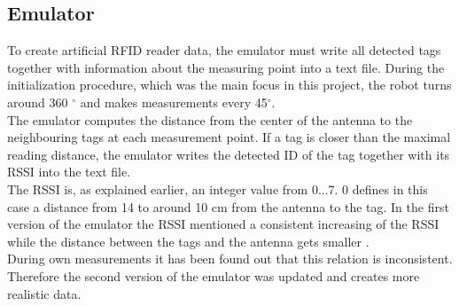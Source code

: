 \subsection{Emulator}
To create artificial RFID reader data, the emulator must write all detected tags together with information about the measuring point into a text file. During the initialization procedure, which was the main focus in this project, the robot turns around 360 $^\circ$ and makes measurements every 45$^\circ$. \\
The emulator computes the distance from the center of the antenna to the neighbouring tags at each measurement point. If a tag is closer than the maximal reading distance, the emulator writes the detected ID of the tag together with its RSSI into the text file. \\
The RSSI is, as explained earlier, an integer value from 0...7. 0 defines in this case a distance from 14 to around 10 cm from the antenna to the tag. In the first version of the emulator the RSSI mentioned a consistent increasing of the RSSI while the distance between the tags and the antenna gets smaller \cite{ChristofRohrigDanielHessandFrankKunemund.}. \\
During own measurements it has been found out that this relation is inconsistent. Therefore the second version of the emulator was updated and creates more realistic data.\\

